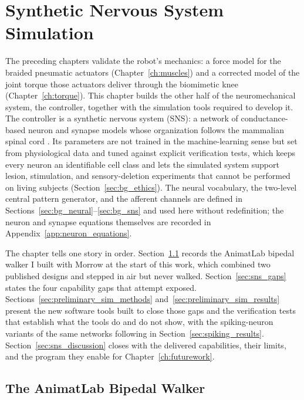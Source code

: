 ﻿\chapter{Synthetic Nervous System Simulation}\label{ch:sns}
\graphicspath{{../Figures/60-sns/}{figs/60-sns/}{../Figures/60-sns/AnimatLab_reference/}{figs/60-sns/AnimatLab_reference/}}

The preceding chapters validate the robot's mechanics: a force model for the braided pneumatic actuators (Chapter~\ref{ch:muscles}) and a corrected model of the joint torque those actuators deliver through the biomimetic knee (Chapter~\ref{ch:torque}). This chapter builds the other half of the neuromechanical system, the controller, together with the simulation tools required to develop it. The controller is a synthetic nervous system (SNS): a network of conductance-based neuron and synapse models whose organization follows the mammalian spinal cord \citep{rybak_modelling_2006, mccrea_organization_2008, deng_neuromechanical_2019}. Its parameters are not trained in the machine-learning sense but set from physiological data and tuned against explicit verification tests, which keeps every neuron an identifiable cell class and lets the simulated system support lesion, stimulation, and sensory-deletion experiments that cannot be performed on living subjects (Section~\ref{sec:bg_ethics}). The neural vocabulary, the two-level central pattern generator, and the afferent channels are defined in Sections~\ref{sec:bg_neural}--\ref{sec:bg_sns} and used here without redefinition; the neuron and synapse equations themselves are recorded in Appendix~\ref{app:neuron_equations}.

The chapter tells one story in order. Section~\ref{sec:prior_walker} records the AnimatLab bipedal walker I built with Morrow at the start of this work, which combined two published designs and stepped in air but never walked. Section~\ref{sec:sns_gaps} states the four capability gaps that attempt exposed. Sections~\ref{sec:preliminary_sim_methods} and~\ref{sec:preliminary_sim_results} present the new software tools built to close those gaps and the verification tests that establish what the tools do and do not show, with the spiking-neuron variants of the same networks following in Section~\ref{sec:spiking_results}. Section~\ref{sec:sns_discussion} closes with the delivered capabilities, their limits, and the program they enable for Chapter~\ref{ch:futurework}.

\section{The AnimatLab Bipedal Walker}\label{sec:prior_walker}

